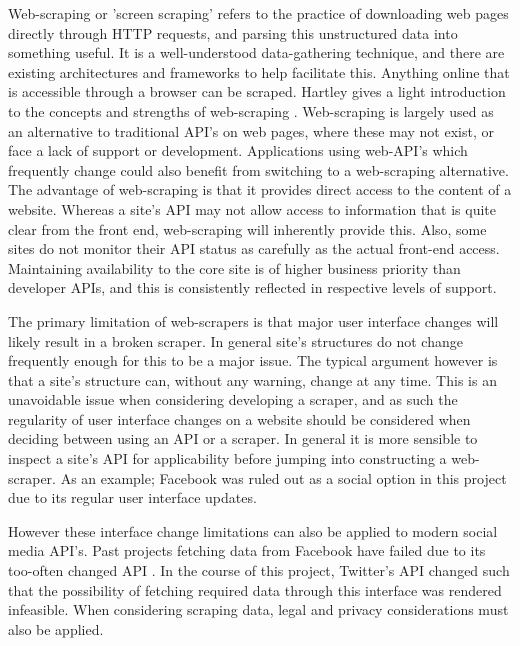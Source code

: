 Web-scraping or 'screen scraping' refers to the practice of downloading web pages directly through HTTP requests, and parsing this unstructured data into something useful. It is a well-understood data-gathering technique, and there are existing architectures and frameworks to help facilitate this.  Anything online that is accessible through a browser can be scraped. Hartley gives a light introduction to the concepts and strengths of web-scraping \cite{no_api_for_me}. Web-scraping is largely used as an alternative to traditional API's on web pages, where these may not exist, or face a lack of support or development. Applications using web-API's which frequently change could also benefit from switching to a web-scraping alternative. The advantage of web-scraping is that it provides direct access to the content of a website. Whereas a site's API may not allow access to information that is quite clear from the front end, web-scraping will inherently provide this. Also, some sites do not monitor their API status as carefully as the actual front-end access. Maintaining availability to the core site is of higher business priority than developer APIs, and this is consistently reflected in respective levels of support. 

The primary limitation of web-scrapers is that major user interface changes will likely result in a broken scraper. In general site's structures do not change frequently enough for this to be a major issue. The typical argument however is that a site's structure can, without any warning, change at any time. This is an unavoidable issue when considering developing a scraper, and as such the regularity of user interface changes on a website should be considered when deciding between using an API or a scraper. In general it is more sensible to inspect a site's API for applicability before jumping into constructing a web-scraper. As an example; Facebook was ruled out as a social option in this project due to its regular user interface updates. 

However these interface change limitations can also be applied to modern social media API's. Past projects fetching data from Facebook have failed due to its too-often changed API \cite{}. In the course of this project, Twitter's API changed such that the possibility of fetching required data through this interface was rendered infeasible. When considering scraping data, legal and privacy considerations must also be applied.


